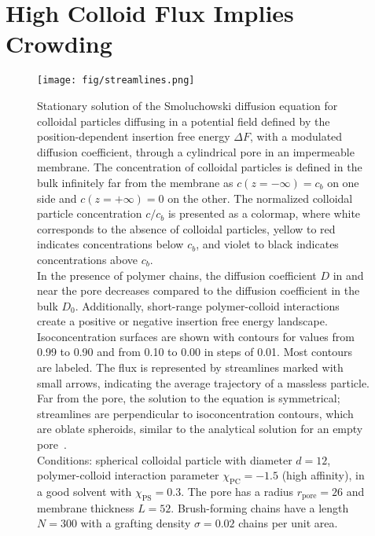 \documentclass[12pt, a4paper]{article}
\begin{document}
\section{High Colloid Flux Implies Crowding}

\begin{figure}
    \centering
    \texttt{[image: fig/streamlines.png]}
    \caption{
    Stationary solution of the Smoluchowski diffusion equation for colloidal particles diffusing in a potential field defined by the position-dependent insertion free energy $\Delta F$, with a modulated diffusion coefficient, through a cylindrical pore in an impermeable membrane.
    The concentration of colloidal particles is defined in the bulk infinitely far from the membrane as $c(z = -\infty) = c_{b}$ on one side and $c(z = +\infty) = 0$ on the other.
    The normalized colloidal particle concentration $c / c_{b}$ is presented as a colormap, where white corresponds to the absence of colloidal particles, yellow to red indicates concentrations below $c_{b}$, and violet to black indicates concentrations above $c_{b}$.
    \\
    In the presence of polymer chains, the diffusion coefficient $D$ in and near the pore decreases compared to the diffusion coefficient in the bulk $D_0$.
    Additionally, short-range polymer-colloid interactions create a positive or negative insertion free energy landscape.
    \\
    Isoconcentration surfaces are shown with contours for values from 0.99 to 0.90 and from 0.10 to 0.00 in steps of 0.01.
    Most contours are labeled.
    The flux is represented by streamlines marked with small arrows, indicating the average trajectory of a massless particle.
    \\
    Far from the pore, the solution to the equation is symmetrical; streamlines are perpendicular to isoconcentration contours, which are oblate spheroids, similar to the analytical solution for an empty pore~\cite{Brunn1984}.
    \\
    Conditions: spherical colloidal particle with diameter $d = 12$, polymer-colloid interaction parameter $\chi_{\textrm{PC}} = -1.5$ (high affinity), in a good solvent with $\chi_{\textrm{PS}} = 0.3$.
    The pore has a radius $r_{\textrm{pore}} = 26$ and membrane thickness $L = 52$.
    Brush-forming chains have a length $N = 300$ with a grafting density $\sigma = 0.02$ chains per unit area.
    }
    \label{fig:colloid_concentration}
\end{figure}
\end{document}
